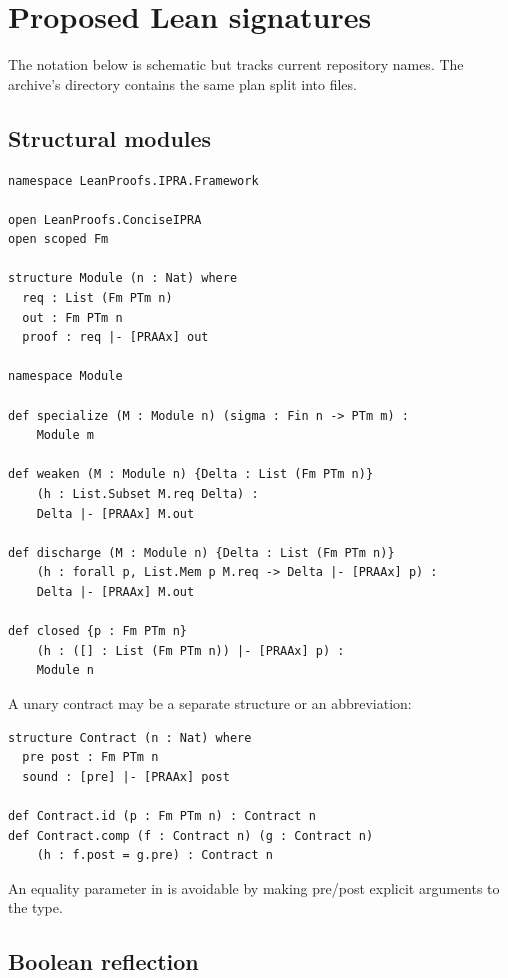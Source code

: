 
\section{Proposed Lean signatures}
\label{app:signatures}

The notation below is schematic but tracks current repository names.  The
archive's  directory contains the same plan split into files.

\subsection{Structural modules}

\begin{lstlisting}[language={}]
namespace LeanProofs.IPRA.Framework

open LeanProofs.ConciseIPRA
open scoped Fm

structure Module (n : Nat) where
  req : List (Fm PTm n)
  out : Fm PTm n
  proof : req |- [PRAAx] out

namespace Module

def specialize (M : Module n) (sigma : Fin n -> PTm m) :
    Module m

def weaken (M : Module n) {Delta : List (Fm PTm n)}
    (h : List.Subset M.req Delta) :
    Delta |- [PRAAx] M.out

def discharge (M : Module n) {Delta : List (Fm PTm n)}
    (h : forall p, List.Mem p M.req -> Delta |- [PRAAx] p) :
    Delta |- [PRAAx] M.out

def closed {p : Fm PTm n}
    (h : ([] : List (Fm PTm n)) |- [PRAAx] p) :
    Module n
\end{lstlisting}

A unary contract may be a separate structure or an abbreviation:
\begin{lstlisting}[language={}]
structure Contract (n : Nat) where
  pre post : Fm PTm n
  sound : [pre] |- [PRAAx] post

def Contract.id (p : Fm PTm n) : Contract n
def Contract.comp (f : Contract n) (g : Contract n)
    (h : f.post = g.pre) : Contract n
\end{lstlisting}
An equality parameter in  is avoidable by making pre/post explicit
arguments to the type.

\subsection{Boolean reflection}


